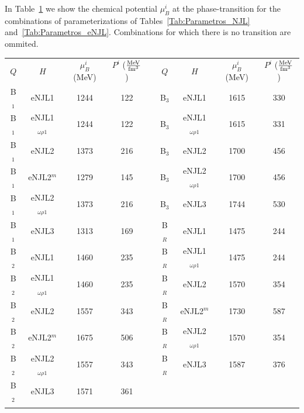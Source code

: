 \documentclass{ws-ijmpcs}
\begin{document}
In Table~\ref{Tab:Transition_chemical_pot} we show the chemical potential $\mu_B^i$ at the phase-transition for the combinations of parameterizations of Tables~\ref{Tab:Parametros_NJL} and~\ref{Tab:Parametros_eNJL}. Combinations for which there is no transition are ommited.


\begin{table}[htb]
{\begin{tabular}{@{}ccccccccc@{}} \toprule
$Q$ & $H$ & $\mu_B^i$ (MeV) & $P^i$ ($\frac{\rm{MeV}}{\rm{fm}^3}$) && $Q$ & $H$ & $\mu_B^i$ (MeV) & $P^i$ ($\frac{\rm{MeV}}{\rm{fm}^3}$)  \\ \colrule
B$_1$ & eNJL1 & 1244 & 122                   &&  B$_3$ & eNJL1 & 1615 & 330                   \\
B$_1$ & eNJL1$_{\omega\rho 1}$ & 1244 & 122  &&  B$_3$ & eNJL1$_{\omega\rho 1}$ & 1615 & 331  \\
B$_1$ & eNJL2 & 1373 & 216                   &&  B$_3$ & eNJL2 & 1700 & 456                   \\
B$_1$ & eNJL2$^m$ & 1279 & 145               &&  B$_3$ & eNJL2$_{\omega\rho 1}$ & 1700 & 456  \\
B$_1$ & eNJL2$_{\omega\rho 1}$ & 1373 & 216  &&  B$_3$ & eNJL3 & 1744 & 530                   \\
B$_1$ & eNJL3 & 1313 & 169                   &&  B$_R$ & eNJL1 & 1475 & 244                   \\
B$_2$ & eNJL1 & 1460 & 235                   &&  B$_R$ & eNJL1$_{\omega\rho 1}$ & 1475 & 244  \\
B$_2$ & eNJL1$_{\omega\rho 1}$ & 1460 & 235  &&  B$_R$ & eNJL2 & 1570 & 354                   \\
B$_2$ & eNJL2 & 1557 & 343                   &&  B$_R$ & eNJL2$^m$ & 1730 & 587               \\
B$_2$ & eNJL2$^m$ & 1675 & 506               &&  B$_R$ & eNJL2$_{\omega\rho 1}$ & 1570 & 354  \\
B$_2$ & eNJL2$_{\omega\rho 1}$ & 1557 & 343  &&  B$_R$ & eNJL3 & 1587 & 376                   \\
B$_2$ & eNJL3 & 1571 & 361                   &&  \\
\botrule
\end{tabular} \label{Tab:Transition_chemical_pot}}
\end{table}


\end{document}
